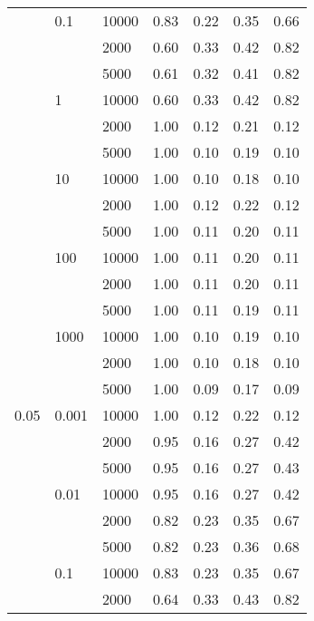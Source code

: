 \begin{tabular}{lllrrrr}
      & 0.1 & 10000 &       0.83 &       0.22 &       0.35 &       0.66 \\
      &       & 2000 &       0.60 &       0.33 &       0.42 &       0.82 \\
      &       & 5000 &       0.61 &       0.32 &       0.41 &       0.82 \\
      & 1 & 10000 &       0.60 &       0.33 &       0.42 &       0.82 \\
      &       & 2000 &       1.00 &       0.12 &       0.21 &       0.12 \\
      &       & 5000 &       1.00 &       0.10 &       0.19 &       0.10 \\
      & 10 & 10000 &       1.00 &       0.10 &       0.18 &       0.10 \\
      &       & 2000 &       1.00 &       0.12 &       0.22 &       0.12 \\
      &       & 5000 &       1.00 &       0.11 &       0.20 &       0.11 \\
      & 100 & 10000 &       1.00 &       0.11 &       0.20 &       0.11 \\
      &       & 2000 &       1.00 &       0.11 &       0.20 &       0.11 \\
      &       & 5000 &       1.00 &       0.11 &       0.19 &       0.11 \\
      & 1000 & 10000 &       1.00 &       0.10 &       0.19 &       0.10 \\
      &       & 2000 &       1.00 &       0.10 &       0.18 &       0.10 \\
      &       & 5000 &       1.00 &       0.09 &       0.17 &       0.09 \\
0.05 & 0.001 & 10000 &       1.00 &       0.12 &       0.22 &       0.12 \\
      &       & 2000 &       0.95 &       0.16 &       0.27 &       0.42 \\
      &       & 5000 &       0.95 &       0.16 &       0.27 &       0.43 \\
      & 0.01 & 10000 &       0.95 &       0.16 &       0.27 &       0.42 \\
      &       & 2000 &       0.82 &       0.23 &       0.35 &       0.67 \\
      &       & 5000 &       0.82 &       0.23 &       0.36 &       0.68 \\
      & 0.1 & 10000 &       0.83 &       0.23 &       0.35 &       0.67 \\
      &       & 2000 &       0.64 &       0.33 &       0.43 &       0.82 \\

\end{tabular}
